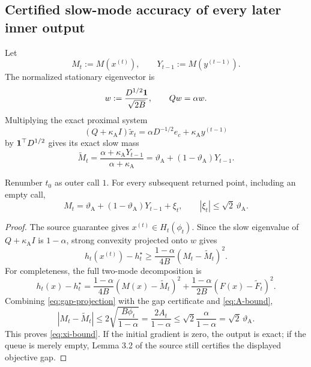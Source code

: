 \documentclass[11pt]{article}
\begin{document}
\subsection{Certified slow-mode accuracy of every later inner output}

Let
\begin{equation}
  M_t:=M(x^{(t)}),
  \qquad
  Y_{t-1}:=M(y^{(t-1)}).
  \label{eq:M-Y}
\end{equation}
The normalized stationary eigenvector is
\[
  w:=\frac{D^{1/2}\mathbf{1}}{\sqrt{2B}},
  \qquad
  Qw=\alpha w.
\]
Multiplying the exact proximal system
\[
  (Q+\kappa_{\mathrm A} I)\widetilde x_t
  =\alpha D^{-1/2}e_c+\kappa_{\mathrm A} y^{(t-1)}
\]
by $\mathbf{1}^\top D^{1/2}$ gives its exact slow mass
\begin{equation}
  \widetilde M_t
  =\frac{\alpha+\kappa_{\mathrm A} Y_{t-1}}{\alpha+\kappa_{\mathrm A}}
  =\vartheta_{\mathrm A}+(1-\vartheta_{\mathrm A})Y_{t-1}.
  \label{eq:exact-prox-mass}
\end{equation}

\begin{lemma}
\label{lem:prox-error}
Renumber $t_0$ as outer call $1$.  For every subsequent returned point,
including an empty call,
\begin{equation}
  M_t=\vartheta_{\mathrm A}+(1-\vartheta_{\mathrm A})Y_{t-1}+\xi_t,
  \qquad
  |\xi_t|\leq\sqrt2\,\vartheta_{\mathrm A}.
  \label{eq:xi-bound}
\end{equation}
\end{lemma}

\begin{proof}
The source guarantee gives $x^{(t)}\in H_t(\phi_t)$.  Since the slow
eigenvalue of $Q+\kappa_{\mathrm A} I$ is $1-\alpha$, strong convexity projected onto $w$
gives
\begin{equation}
  h_t(x^{(t)})-h_t^\star
  \geq\frac{1-\alpha}{4B}
       (M_t-\widetilde M_t)^2.
  \label{eq:gap-projection}
\end{equation}
For completeness, the full two-mode decomposition is
\[
  h_t(x)-h_t^\star
  =\frac{1-\alpha}{4B}(M(x)-\widetilde M_t)^2
   +\frac{1-\alpha}{2B}(F(x)-\widetilde F_t)^2.
\]
Combining \cref{eq:gap-projection} with the gap certificate and
\cref{eq:A-bound},
\[
  |M_t-\widetilde M_t|
  \leq2\sqrt{\frac{B\phi_t}{1-\alpha}}
  =\frac{2A_t}{1-\alpha}
  \leq\sqrt2\frac{\alpha}{1-\alpha}
  =\sqrt2\,\vartheta_{\mathrm A}.
\]
This proves \cref{eq:xi-bound}.  If the initial gradient is zero, the output
is exact; if the queue is merely empty, Lemma 3.2 of the source still certifies
the displayed objective gap.
\end{proof}
\end{document}
